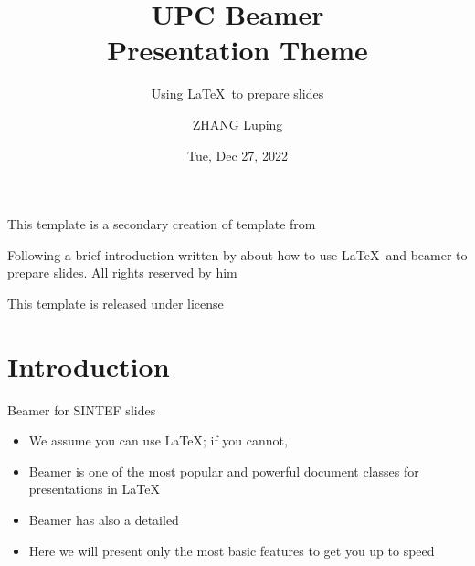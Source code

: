 \documentclass{sintefbeamer}
\title{UPC Beamer\\ Presentation Theme}
\subtitle{Using \LaTeX\ to prepare slides}
\author{\href{mailto:zlp@upc.edu.cn}{ZHANG Luping}}
\date{Tue, Dec 27, 2022}
\begin{document}
\maketitle

\begin{frame}

  This template is a secondary creation of  template from  \vspace{\baselineskip}

  Following a brief introduction written by  about how to use \LaTeX\ and beamer to prepare slides. All rights reserved by him\vspace{\baselineskip}

  This template is released under  license

\end{frame}



\section{Introduction}

\begin{frame}{Beamer for SINTEF slides}{\thesection \, \secname}

  \begin{itemize}
    \item We assume you can use \LaTeX; if you cannot,
    \item Beamer is one of the most popular and powerful document
          classes for presentations in \LaTeX
    \item Beamer has also a detailed
    \item Here we will present only the most basic features to get you up to speed
  \end{itemize}
\end{frame}
\end{document}
